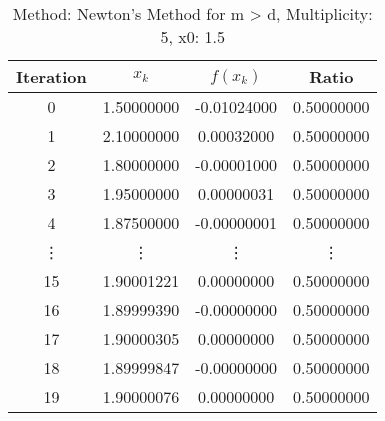 \begin{table}
\centering
\caption{Method: Newton's Method for m > d, Multiplicity: 5, x0: 1.5}
\label{tab:table_Newton's_Method_for_m_>_d_5_1_5}
\begin{tabular}{c c c c}
\toprule
Iteration &      $x_k$ &    $f(x_k)$ &      Ratio \\
\midrule
        0 & 1.50000000 & -0.01024000 & 0.50000000 \\
        1 & 2.10000000 &  0.00032000 & 0.50000000 \\
        2 & 1.80000000 & -0.00001000 & 0.50000000 \\
        3 & 1.95000000 &  0.00000031 & 0.50000000 \\
        4 & 1.87500000 & -0.00000001 & 0.50000000 \\
   \vdots &     \vdots &      \vdots &     \vdots \\
       15 & 1.90001221 &  0.00000000 & 0.50000000 \\
       16 & 1.89999390 & -0.00000000 & 0.50000000 \\
       17 & 1.90000305 &  0.00000000 & 0.50000000 \\
       18 & 1.89999847 & -0.00000000 & 0.50000000 \\
       19 & 1.90000076 &  0.00000000 & 0.50000000 \\
\bottomrule
\end{tabular}
\end{table}
